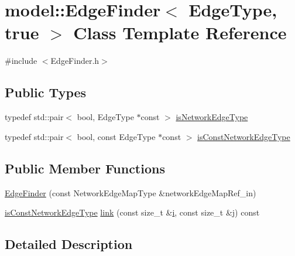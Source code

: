 \hypertarget{classmodel_1_1_edge_finder_3_01_edge_type_00_01true_01_4}{}\section{model\+:\+:Edge\+Finder$<$ Edge\+Type, true $>$ Class Template Reference}
\label{classmodel_1_1_edge_finder_3_01_edge_type_00_01true_01_4}


{\ttfamily \#include $<$Edge\+Finder.\+h$>$}

\subsection*{Public Types}
\begin{DoxyCompactItemize}
\item 
typedef std\+::pair$<$ bool, Edge\+Type $\ast$const  $>$ \hyperlink{classmodel_1_1_edge_finder_3_01_edge_type_00_01true_01_4_ac9d32373c2d44e63c768e3de6009354c}{is\+Network\+Edge\+Type}
\item 
typedef std\+::pair$<$ bool, const Edge\+Type $\ast$const  $>$ \hyperlink{classmodel_1_1_edge_finder_3_01_edge_type_00_01true_01_4_a284d4a05621d27fa7cfd02dbebeff026}{is\+Const\+Network\+Edge\+Type}
\end{DoxyCompactItemize}
\subsection*{Public Member Functions}
\begin{DoxyCompactItemize}
\item 
\hyperlink{classmodel_1_1_edge_finder_3_01_edge_type_00_01true_01_4_a58f001aae3a5681a906baaf7db77f5fd}{Edge\+Finder} (const Network\+Edge\+Map\+Type \&network\+Edge\+Map\+Ref\+\_\+in)
\item 
\hyperlink{classmodel_1_1_edge_finder_3_01_edge_type_00_01true_01_4_a284d4a05621d27fa7cfd02dbebeff026}{is\+Const\+Network\+Edge\+Type} \hyperlink{classmodel_1_1_edge_finder_3_01_edge_type_00_01true_01_4_a1629d5f29bf091ed5827ee38864bacb7}{link} (const size\+\_\+t \&\hyperlink{_cubic_spline_intersection_8m_a6f6ccfcf58b31cb6412107d9d5281426}{i}, const size\+\_\+t \&j) const 
\end{DoxyCompactItemize}


\subsection{Detailed Description}
